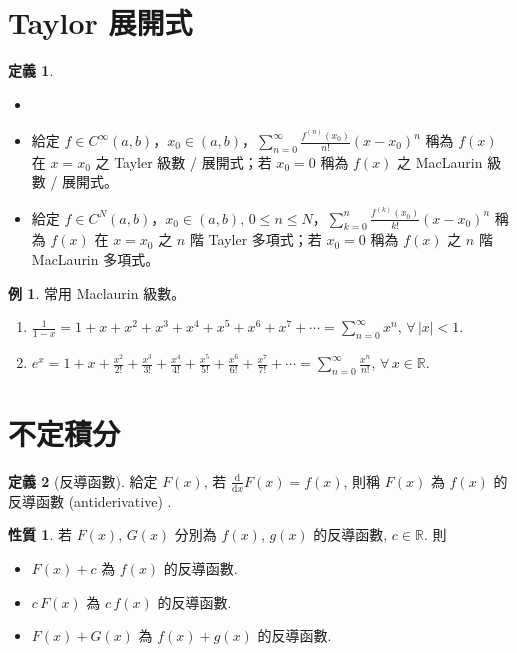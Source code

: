 \documentclass[12pt,a4paper]{extarticle}
\newcommand{\ds}{\displaystyle}
\theoremstyle{definition}
\newtheorem*{dfn}{定義}
\newtheorem*{prp}{性質}
\newtheorem*{ex}{例}
\begin{document}
\section*{Taylor 展開式}

\begin{dfn}
  \begin{itemize}\setlength{\itemsep}{0pt}
    \item[]
    \item 給定 $f\in C^\infty(a, b)$，$x_0\in(a, b)$，$\ds\sum_{n = 0}^\infty\frac{f^{(n)}(x_0)}{n!}(x - x_0)^n$ 稱為 $f(x)$ 在 $x = x_0$ 之 Tayler 級數 / 展開式；若 $x_0 = 0$ 稱為 $f(x)$ 之 MacLaurin 級數 / 展開式。
    \item 給定 $f\in C^N(a, b)$，$x_0\in(a, b)$, $0\leqslant n\leqslant N$，$\ds\sum_{k = 0}^n\frac{f^{(k)}(x_0)}{k!}(x - x_0)^n$ 稱為 $f(x)$ 在 $x = x_0$ 之 $n$ 階 Tayler 多項式；若 $x_0 = 0$ 稱為 $f(x)$ 之 $n$ 階 MacLaurin 多項式。
  \end{itemize}
\end{dfn}

\begin{ex} 常用 Maclaurin 級數。
  \begin{enumerate}\setlength{\itemsep}{-1pt}
    \item $\ds \frac{1}{1 - x} = 1 + x + x^2 + x^3 + x^4 + x^5 + x^6 + x^7 + \cdots = \sum_{n = 0}^\infty x^n$, $\forall\,|x| < 1$.
    \item $\ds e^x = 1 + x + \frac{x^2}{2!} + \frac{x^3}{3!} + \frac{x^4}{4!} + \frac{x^5}{5!} + \frac{x^6}{6!} + \frac{x^7}{7!} + \cdots = \sum_{n = 0}^\infty\frac{x^n}{n!}$, $\forall\,x\in\mathbb{R}$.
  \end{enumerate}
\end{ex}

\section*{不定積分}

\begin{dfn}[反導函數]
  給定 $\ds F(x)$, 若 $\ds\frac{\text{d}}{\text{d}x} F(x) = f(x)$, 則稱 $F(x)$ 為 $f(x)$ 的反導函數 (antiderivative) .  
\end{dfn}

\begin{prp}若 $\ds F(x)$, $\ds G(x)$ 分別為 $f(x)$, $g(x)$ 的反導函數, $c\in\mathbb{R}$. 則
  \begin{itemize}\setlength{\itemsep}{0pt}
    \item $\ds F(x) + c$ 為 $f(x)$ 的反導函數. 
    \item $\ds c\,F(x)$ 為 $c\,f(x)$ 的反導函數. 
    \item $\ds F(x) + G(x)$ 為 $f(x) + g(x)$ 的反導函數. 
  \end{itemize}
\end{prp}
\end{document}
